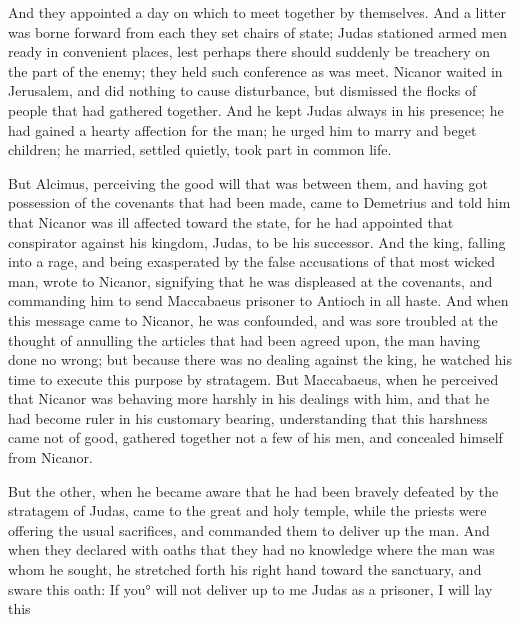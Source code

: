 {And they appointed a day on which to meet together by themselves. And a litter was borne forward from each
{} they set chairs of state;
Judas stationed armed men ready in convenient places, lest perhaps there should suddenly be treachery on the part of the enemy; they held such conference as was meet.
Nicanor waited in Jerusalem, and did nothing to cause disturbance, but dismissed the flocks of people that had gathered together.
And he kept Judas always in his presence; he had gained a hearty affection for the man;
he urged him to marry and beget children; he married, settled quietly, took part in common life.
\par }{\PP {}But Alcimus, perceiving the good will that was between them,
 and having got possession of the covenants that had been made, came to Demetrius and told him that Nicanor was ill affected toward the state, for he had appointed that conspirator against his kingdom, Judas, to be his successor.
And the king, falling into a rage, and being exasperated by the false accusations of that most wicked man, wrote to Nicanor, signifying that he was displeased at the covenants, and commanding him to send Maccabaeus prisoner to Antioch in all haste.
And when this message came to Nicanor, he was confounded, and was sore troubled at the thought of annulling the articles that had been agreed upon, the man having done no wrong;
but because there was no dealing against the king, he watched his time to execute this purpose by stratagem.
But Maccabaeus, when he perceived that Nicanor was behaving more harshly in his dealings with him, and that he had become ruler in his customary bearing, understanding that this harshness came not of good, gathered together not a few of his men, and concealed himself from Nicanor.
\par }{\PP {}But the other,
 when he became aware that he had been bravely defeated by the stratagem of
 Judas, came to the
 great and holy temple, while the priests were offering the usual sacrifices, and commanded them to deliver up the man.
And when they declared with oaths that they had no knowledge where the man was whom he sought,
he stretched forth his right hand toward the sanctuary, and sware this oath: If you° will not deliver up to me Judas as a prisoner, I will lay this
}
